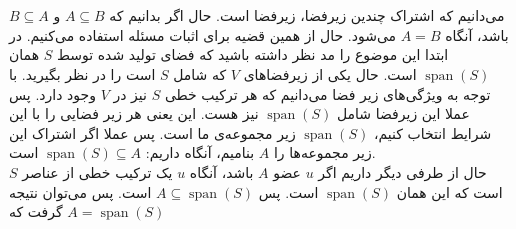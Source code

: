 \\\\
می‌دانیم که اشتراک چندین زیرفضا، زیرفضا است. حال اگر بدانیم که
$A \subseteq B$ و $B \subseteq A$ باشد، آنگاه $A = B$
می‌شود.
حال از همین قضیه برای اثبات مسئله استفاده می‌کنیم.
در ابتدا این موضوع را مد نظر داشته باشید که فضای تولید شده توسط
$S$ همان $\operatorname{span}(S)$
است.
حال یکی از زیرفضا‌های
$V$
که شامل
$S$
است را در نظر بگیرید. با توجه به ویژگی‌های زیر فضا می‌دانیم که هر ترکیب خطی
$S$
نیز در
$V$
وجود دارد. پس عملا این زیرفضا شامل
$\operatorname{span}(S)$
نیز هست. این یعنی هر زیر فضایی را با این شرایط انتخاب کنیم،
$\operatorname{span}(S)$
زیر مجموعه‌ی ما است. پس عملا اگر اشتراک این زیر مجموعه‌ها را
$A$
بنامیم، آنگاه داریم:
$\operatorname{span}(S) \subseteq A$
است.
\\\noindent
حال از طرفی دیگر داریم اگر
$u$
عضو
$A$
باشد، آنگاه
$u$
یک ترکیب خطی از عناصر
$S$
است که این همان
$\operatorname{span}(S)$
است.
پس
$A \subseteq \operatorname{span}(S)$
است.
پس می‌توان نتیجه گرفت که
$A = \operatorname{span}(S)$